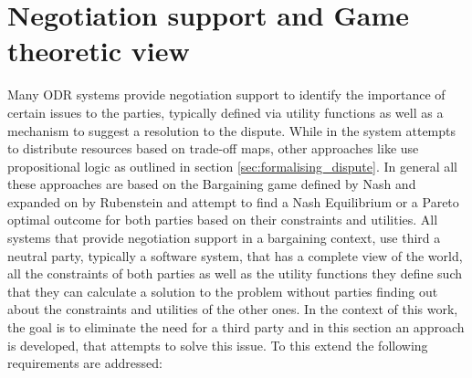 \documentclass[12pt,msc,a4paper,oneside]{ucl_thesis}
\begin{document}
\section{Negotiation support and Game theoretic view} \label{sec:negotiation_support}
Many ODR systems provide negotiation support to identify the importance of certain issues to the parties, typically defined via utility functions as well as a mechanism to suggest a resolution to the dispute. While in \cite{Bellucci:2004:IAI:1032651.1033678} the system attempts to distribute resources based on trade-off maps, other approaches like \cite{Ragone:2006:PAO:1124566.1124569} use propositional logic as outlined in section \ref{sec:formalising_dispute}. In general all these approaches are based on the Bargaining game defined by Nash \cite{Nash:bargaining} and expanded on by Rubenstein \cite{Rubenstein} and attempt to find a Nash Equilibrium or a Pareto optimal outcome for both parties based on their constraints and utilities. All systems that provide negotiation support in a bargaining context, use third a neutral party, typically a software system, that has a complete view of the world, all the constraints of both parties as well as the utility functions they define such that they can calculate a solution to the problem without parties finding out about the constraints and utilities of the other ones. In the context of this work, the goal is to eliminate the need for a third party and in this section an approach is developed, that attempts to solve this issue. To this extend the following requirements are addressed:
\end{document}
